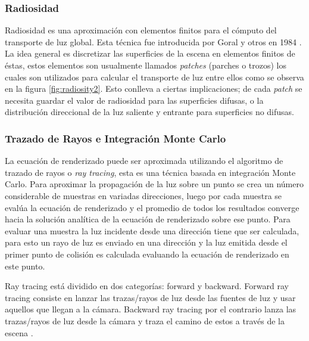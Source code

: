 \subsubsection{Radiosidad}
\label{subsec:radiosity}

Radiosidad es una aproximación con elementos finitos para el cómputo del transporte de luz global. Esta técnica fue introducida por Goral y otros en 1984 \cite{goral84}. La idea general es discretizar las superficies de la escena en elementos finitos de éstas, estos elementos son usualmente llamados \emph{patches} (parches o trozos) los cuales son utilizados para calcular el transporte de luz entre ellos como se observa en la figura \ref{fig:radiosity2}. Esto conlleva a ciertas implicaciones; de cada \emph{patch} se necesita guardar el valor de radiosidad para las superficies difusas, o la distribución direccional de la luz saliente y entrante para superficies no difusas.

\subsubsection{Trazado de Rayos e Integración Monte Carlo}
\label{subsec:monte_carlo_raytracing}
La ecuación de renderizado puede ser aproximada utilizando el algoritmo de trazado de rayos o \emph{ray tracing}, esta es una técnica basada en integración Monte Carlo. Para aproximar la propagación de la luz sobre un punto se crea un número considerable de muestras en variadas direcciones, luego por cada muestra se evalúa la ecuación de renderizado y el promedio de todos los resultados converge hacia la solución analítica de la ecuación de renderizado sobre ese punto. Para evaluar una muestra la luz incidente desde una dirección tiene que ser calculada, para esto un rayo de luz es enviado en una dirección y la luz emitida desde el primer punto de colisión es calculada evaluando la ecuación de renderizado en este punto.

Ray tracing está dividido en dos categorías: forward y backward. Forward ray tracing consiste en lanzar las trazas/rayos de luz desde las fuentes de luz y usar aquellos que llegan a la cámara. Backward ray tracing por el contrario lanza las trazas/rayos de luz desde la cámara y traza el camino de estos a través de la escena \cite{Arvo86backwardray}.

